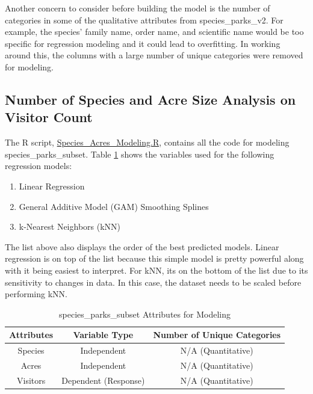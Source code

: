 \documentclass[stu, floatsintext, 11pt]{apa7}
\begin{document}
Another concern to consider before building the model is the number of categories in some of the qualitative attributes from species\_parks\_v2. For example, the species' family name, order name, and scientific name would be too specific for regression modeling and it could lead to overfitting. In working around this, the columns with a large number of unique categories were removed for modeling.

\subsection{Number of Species and Acre Size Analysis on Visitor Count}
The R script, \href{https://github.com/ohkaaaaay/NP_Biodiversity/blob/main/Species_Acres_Modeling.R}{Species\_Acres\_Modeling.R}, contains all the code for modeling species\_parks\_subset. Table \ref{tab:species_parks_subset} shows the variables used for the following regression models: 
\begin{enumerate}
    \item Linear Regression
    \item General Additive Model (GAM) Smoothing Splines
    \item k-Nearest Neighbors (kNN)
\end{enumerate}

The list above also displays the order of the best predicted models. Linear regression is on top of the list because this simple model is pretty powerful along with it being easiest to interpret. For kNN, its on the bottom of the list due to its sensitivity to changes in data. In this case, the dataset needs to be scaled before performing kNN.

\begin{table}[h!]
    \centering
    \caption{species\_parks\_subset Attributes for Modeling}
    \begin{tabular}{c c c}
    \hline
    \textbf{Attributes} & \textbf{Variable Type} & \textbf{Number of Unique Categories} \\
    \hline
    Species &  Independent & N/A (Quantitative) \\
    Acres &  Independent & N/A (Quantitative)\\
    Visitors & Dependent (Response) & N/A (Quantitative) \\
    \hline
    \end{tabular}
    \label{tab:species_parks_subset}
\end{table}
\end{document}
